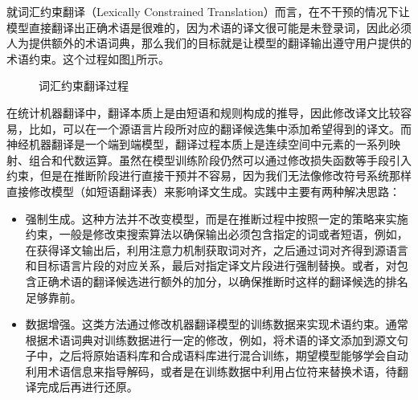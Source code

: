 \parinterval 就{\small\bfnew 词汇约束翻译}（Lexically Constrained Translation）而言，在不干预的情况下让模型直接翻译出正确术语是很难的，因为术语的译文很可能是未登录词，因此必须人为提供额外的术语词典，那么我们的目标就是让模型的翻译输出遵守用户提供的术语约束。这个过程如图\ref{fig:18-3}所示。
\begin{figure}[htp]
\centering

\caption{词汇约束翻译过程}
\label{fig:18-3}
\end{figure}

\parinterval 在统计机器翻译中，翻译本质上是由短语和规则构成的推导，因此修改译文比较容易，比如，可以在一个源语言片段所对应的翻译候选集中添加希望得到的译文。而神经机器翻译是一个端到端模型，翻译过程本质上是连续空间中元素的一系列映射、组合和代数运算。虽然在模型训练阶段仍然可以通过修改损失函数等手段引入约束，但是在推断阶段进行直接干预并不容易，因为我们无法像修改符号系统那样直接修改模型（如短语翻译表）来影响译文生成。实践中主要有两种解决思路：

\begin{itemize}
\vspace{0.5em}
\item 强制生成。这种方法并不改变模型，而是在推断过程中按照一定的策略来实施约束，一般是修改束搜索算法以确保输出必须包含指定的词或者短语，例如，在获得译文输出后，利用注意力机制获取词对齐，之后通过词对齐得到源语言和目标语言片段的对应关系，最后对指定译文片段进行强制替换。或者，对包含正确术语的翻译候选进行额外的加分，以确保推断时这样的翻译候选的排名足够靠前。

\vspace{0.5em}
\item 数据增强。这类方法通过修改机器翻译模型的训练数据来实现术语约束。通常根据术语词典对训练数据进行一定的修改，例如，将术语的译文添加到源文句子中，之后将原始语料库和合成语料库进行混合训练，期望模型能够学会自动利用术语信息来指导解码，或者是在训练数据中利用占位符来替换术语，待翻译完成后再进行还原。

\vspace{0.5em}
\end{itemize}

